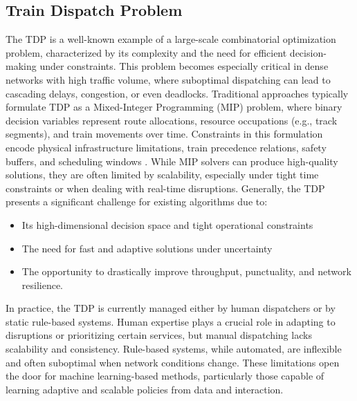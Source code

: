 \documentclass[runningheads]{llncs}
\begin{document}
\subsection{Train Dispatch Problem}
\label{sss:train}
The TDP is a well-known example of a large-scale combinatorial optimization problem, characterized by its complexity and the need for efficient decision-making under constraints. 
This problem becomes especially critical in dense networks with high traffic volume, where suboptimal dispatching can lead to cascading delays, congestion, or even deadlocks.
Traditional approaches typically formulate TDP as a Mixed-Integer Programming (MIP) problem, where binary decision variables represent route allocations, resource occupations (e.g., track segments), and train movements over time. 
Constraints in this formulation encode physical infrastructure limitations, train precedence relations, safety buffers, and scheduling windows \cite{train:LAMORGESE2013559}. 
While MIP solvers can produce high-quality solutions, they are often limited by scalability, especially under tight time constraints or when dealing with real-time disruptions.
Generally, the TDP presents a significant challenge for existing algorithms due to: \begin{itemize} \item Its high-dimensional decision space and tight operational constraints \item The need for fast and adaptive solutions under uncertainty \item The opportunity to drastically improve throughput, punctuality, and network resilience. \end{itemize}

In practice, the TDP is currently managed either by human dispatchers or by static rule-based systems. 
Human expertise plays a crucial role in adapting to disruptions or prioritizing certain services, but manual dispatching lacks scalability and consistency. 
Rule-based systems, while automated, are inflexible and often suboptimal when network conditions change. 
These limitations open the door for machine learning-based methods, particularly those capable of learning adaptive and scalable policies from data and interaction.
\end{document}
